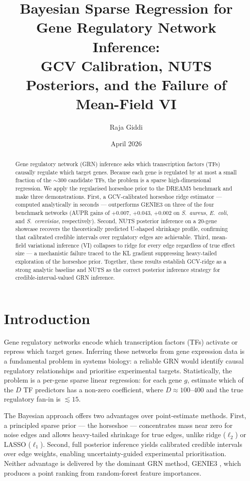 \documentclass[11pt]{article}
\title{Bayesian Sparse Regression for Gene Regulatory Network Inference:\\
       GCV Calibration, NUTS Posteriors, and the Failure of Mean-Field VI}
\author{Raja Giddi}
\date{April 2026}
\begin{document}
\maketitle

\begin{abstract}
Gene regulatory network (GRN) inference asks which transcription factors (TFs) causally
regulate which target genes. Because each gene is regulated by at most a small fraction of
the $\sim$300 candidate TFs, the problem is a sparse high-dimensional regression.
We apply the regularised horseshoe prior \citep{piironen2017} to the DREAM5 benchmark
\citep{marbach2012} and make three demonstrations.
First, a GCV-calibrated horseshoe ridge estimator --- computed analytically in seconds ---
outperforms GENIE3 \citep{huynh2010} on three of the four benchmark networks (AUPR gains of
$+0.007$, $+0.043$, $+0.002$ on \textit{S.~aureus}, \textit{E.~coli}, and
\textit{S.~cerevisiae}, respectively).
Second, NUTS posterior inference on a 20-gene showcase recovers the theoretically predicted
U-shaped shrinkage profile, confirming that calibrated credible intervals over regulatory
edges are achievable.
Third, mean-field variational inference (VI) collapses to ridge for every edge regardless
of true effect size --- a mechanistic failure traced to the KL gradient suppressing
heavy-tailed exploration of the horseshoe prior.
Together, these results establish GCV-ridge as a strong analytic baseline and NUTS as the
correct posterior inference strategy for credible-interval-valued GRN inference.
\end{abstract}

\section{Introduction}

Gene regulatory networks encode which transcription factors (TFs) activate or repress
which target genes. Inferring these networks from gene expression data is a fundamental
problem in systems biology: a reliable GRN would identify causal regulatory relationships
and prioritise experimental targets. Statistically, the problem is a per-gene sparse
linear regression: for each gene $g$, estimate which of the $D$ TF predictors has a
non-zero coefficient, where $D \approx 100$--$400$ and the true regulatory fan-in is
$\lesssim 15$.

The Bayesian approach offers two advantages over point-estimate methods. First, a
principled sparse prior --- the horseshoe \citep{piironen2017} --- concentrates mass near
zero for noise edges and allows heavy-tailed shrinkage for true edges, unlike ridge
($\ell_2$) or LASSO ($\ell_1$). Second, full posterior inference yields calibrated
credible intervals over edge weights, enabling uncertainty-guided experimental
prioritisation. Neither advantage is delivered by the dominant GRN method, GENIE3
\citep{huynh2010}, which produces a point ranking from random-forest feature importances.
\end{document}
